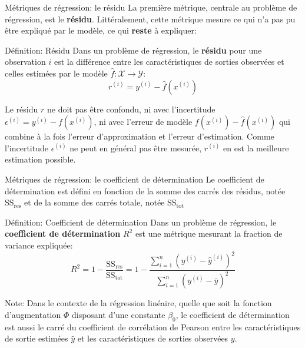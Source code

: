 \documentclass[10pt]{beamer}  %
\begin{document}
\begin{frame}{Métriques de régression: le résidu}
	La première métrique, centrale au problème de régression, est le \textbf{résidu}. Littéralement, cette métrique mesure ce qui n'a pas pu être expliqué par le modèle, ce qui \textbf{reste} à expliquer:
	\begin{block}{Définition: Résidu}
		Dans un problème de régression, le \textbf{résidu} pour une observation $i$ est la différence entre les caractéristiques de sorties observées et celles estimées par le modèle $\hat{f}: \mathcal{X} \to \mathcal{Y}$:
		\begin{equation}
			r^{(i)} = y^{(i)} - \hat{f}(x^{(i)})
			\nonumber
		\end{equation}
	\end{block}
	\pause
	Le résidu $r$ ne doit pas être confondu, ni avec l'incertitude $\epsilon^{(i)} = y^{(i)} - f(x^{(i)})$, ni avec l'erreur de modèle $f(x^{(i)}) - \hat{f}(x^{(i)})$ qui combine à la fois l'erreur d'approximation et l'erreur d'estimation. Comme l'incertitude $\epsilon^{(i)}$ ne peut en général pas être mesurée, $r^{(i)}$ en est la meilleure estimation possible.
\end{frame}

\begin{frame}{Métriques de régression: le coefficient de détermination}
	Le coefficient de détermination est défini en fonction de la somme des carrés des résidus, notée $\text{SS}_{\text{res}}$ et de la somme des carrés totale, notée $\text{SS}_{\text{tot}}$ 
	\begin{block}{Définition: Coefficient de détermination}
		Dans un problème de régression, le \textbf{coefficient de détermination} $R^2$ est une métrique mesurant la fraction de variance expliquée:
		\begin{equation}
			R^2 = 1 - \frac{\text{SS}_{\text{res}}}{\text{SS}_{\text{tot}}} = 1 - \frac{\sum_{i=1}^n \left(y^{(i)} - \hat{y}^{(i)}\right)^2}{\sum_{i=1}^n \left(y^{(i)} - \bar{y}\right)^2}
			\nonumber
		\end{equation}
	\end{block}
	\pause
	Note: Dans le contexte de la régression linéaire, quelle que soit la fonction d'augmentation $\Phi$ disposant d'une constante $\beta_0$, le coefficient de détermination est aussi le carré du coefficient de corrélation de Pearson entre les caractéristiques de sortie estimées $\hat{y}$ et les caractéristiques de sorties observées $y$.
\end{frame}
\end{document}
